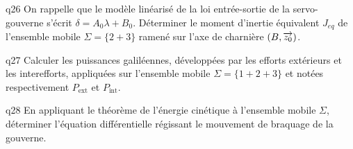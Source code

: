 \begin{multicols}{2}
{\begin{question}{q26}
On rappelle que le modèle linéarisé de la loi entrée-sortie de la servo-gouverne s’écrit $\delta = A_0 \lambda + B_0$. Déterminer le moment d’inertie équivalent $J_{eq}$ de l’ensemble mobile $\Sigma = \{ 2+3\}$ ramené sur l’axe de charnière $\left(B,\overrightarrow{z_0}\right)$.
\ifprof
\begin{corrige}
\end{corrige}
\else
\fi
\begin{reponses}
\end{reponses} \end{question}}  


{\begin{question}{q27}
Calculer les puissances galiléennes, développées par les efforts extérieurs et les interefforts, appliquées sur l’ensemble mobile $\Sigma=\{1+2+3\}$ et notées respectivement $P_{\text{ext}}$ et $P_{\text{int}}$.
\ifprof
\begin{corrige}
\end{corrige}
\else
\fi
\begin{reponses}
\end{reponses} \end{question}}  


{\begin{question}{q28}
En appliquant le théorème de l’énergie cinétique à l’ensemble mobile $\Sigma$, déterminer
l’équation différentielle régissant le mouvement de braquage de la gouverne.
\ifprof
\begin{corrige}
\end{corrige}
\else
\fi
\begin{reponses}
\end{reponses} \end{question}}  



\end{multicols}
